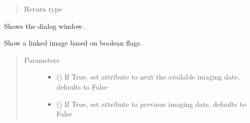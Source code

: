 \documentclass[letterpaper,10pt,english]{sphinxmanual}
\begin{document}
\begin{fulllineitems}
\begin{fulllineitems}
\begin{quote}
\begin{description}
\item[{Return type}] \leavevmode
{\hyperref[\detokenize{polo.crystallography:polo.crystallography.image.Image}]{}}

\end{description}\end{quote}

\end{fulllineitems}


\begin{fulllineitems}
\label{\detokenize{polo.windows:polo.windows.image_pop_dialog.ImagePopDialog.show}}
Shows the dialog window.

\end{fulllineitems}


\begin{fulllineitems}
\label{\detokenize{polo.windows:polo.windows.image_pop_dialog.ImagePopDialog.show_alt_image}}
Show a linked image based on boolean flags.
\begin{quote}\begin{description}
\item[{Parameters}] \leavevmode\begin{itemize}
\item {} 
 (\sphinxstyleliteralemphasis{\sphinxupquote{, }}) \textendash{} If True, set
{\hyperref[\detokenize{polo.windows:polo.windows.image_pop_dialog.ImagePopDialog.image}]{}} 
attribute to next the available imaging date, defaults to False

\item {} 
 (\sphinxstyleliteralemphasis{\sphinxupquote{, }}) \textendash{} If True, set 
{\hyperref[\detokenize{polo.windows:polo.windows.image_pop_dialog.ImagePopDialog.image}]{}}
attribute to previous 
imaging date, defaults to False


\end{itemize}
\end{description}
\end{quote}
\end{fulllineitems}
\end{fulllineitems}
\end{document}
